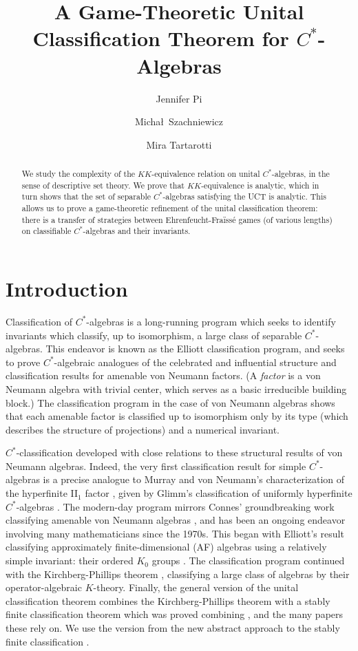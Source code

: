 \documentclass[12pt]{amsart}
\title{A Game-Theoretic Unital Classification Theorem for $C^*$-Algebras}
\author{Jennifer Pi}
\author{Micha\l \, Szachniewicz}
\author{Mira Tartarotti}
\date{}
\begin{document}
\begin{abstract}
    We study the complexity of the $KK$-equivalence relation on unital $C^*$-algebras, in the sense of descriptive set theory. 
    We prove that $KK$-equivalence is analytic, which in turn shows that the set of separable $C^*$-algebras satisfying the UCT is analytic. This allows us to prove a game-theoretic refinement of the unital classification theorem: there is a transfer of strategies between Ehrenfeucht-Fra\"iss\'e games (of various lengths) on classifiable $C^*$-algebras and their invariants.
\end{abstract}


\maketitle

\tableofcontents

\section{Introduction}

Classification of $C^*$-algebras is a long-running program which seeks to identify invariants which classify, up to isomorphism, a large class of separable $C^*$-algebras. 
This endeavor is known as the Elliott classification program, and seeks to prove $C^*$-algebraic analogues of the celebrated and influential structure and classification results for amenable von Neumann factors. (A \textit{factor} is a von Neumann algebra with trivial center, which serves as a basic irreducible building block.)
The classification program in the case of von Neumann algebras shows that each amenable factor is classified up to isomorphism only by its type (which describes the structure of projections) and a numerical invariant.

$C^*$-classification developed with close relations to these structural results of von Neumann algebras.
Indeed, the very first classification result for simple $C^*$-algebras is a precise analogue to Murray and von Neumann's characterization of the hyperfinite II$_1$ factor \cite{murray1943rings}, given by Glimm's classification of uniformly hyperfinite $C^*$-algebras \cite{glimm1960}.
The modern-day program mirrors Connes' groundbreaking work classifying amenable von Neumann algebras \cite{connes1976classification}, and has been an ongoing endeavor involving many mathematicians since the 1970s. This began with Elliott's result classifying approximately finite-dimensional (AF) algebras using a relatively simple invariant: their ordered $K_0$ groups \cite{elliott1976AF}.
The classification program continued with the Kirchberg-Phillips theorem \cite{kirchberg1995classif, phillips2000classif}, classifying a large class of algebras by their operator-algebraic $K$-theory. 
Finally, the general version of the unital classification theorem combines the Kirchberg-Phillips theorem with a stably finite classification theorem which was proved combining \cite{EGLN-classification, GLN-classif-1, GLN-classif-2, TWW-quasidiagonality}, and the many papers these rely on. 
We use the version from the new abstract approach to the stably finite classification \cite[Theorem A]{CGSTW-new-classificationI-2023}.
\end{document}

